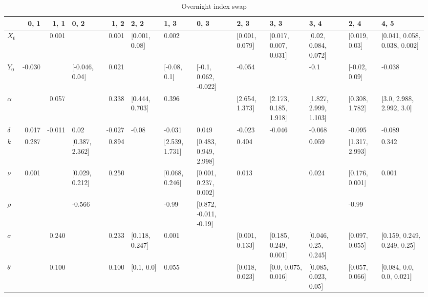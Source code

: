 \begin{table}[H]
	\centering
	\caption{Overnight index swap}
	\label{ois_table}
	
	\begin{adjustbox}{width=\textwidth}

\begin{tabular}{lrrlrllllllll}
	\toprule
	{} &   0, 1 &   1, 1 &            0, 2 &   1, 2 &            2, 2 &            1, 3 &                    0, 3 &            2, 3 &                   3, 3 &                   3, 4 &            2, 4 &                          4, 5 \\
	\midrule
	$X_0$   &        &  0.001 &                 &  0.001 &   [0.001, 0.08] &           0.002 &                         &  [0.001, 0.079] &  [0.017, 0.007, 0.031] &   [0.02, 0.084, 0.072] &   [0.019, 0.03] &  [0.041, 0.058, 0.038, 0.002] \\
	$Y_0$   & -0.030 &        &  [-0.046, 0.04] &  0.021 &                 &    [-0.08, 0.1] &   [-0.1, 0.062, -0.022] &          -0.054 &                        &                   -0.1 &   [-0.02, 0.09] &                        -0.038 \\
	$\alpha$ &        &  0.057 &                 &  0.338 &  [0.444, 0.703] &           0.396 &                         &  [2.654, 1.373] &  [2.173, 0.185, 1.918] &  [1.827, 2.999, 1.103] &  [0.308, 1.782] &      [3.0, 2.988, 2.992, 3.0] \\
	$\delta$ &  0.017 & -0.011 &            0.02 & -0.027 &           -0.08 &          -0.031 &                   0.049 &          -0.023 &                 -0.046 &                 -0.068 &          -0.095 &                        -0.089 \\
	$k$     &  0.287 &        &  [0.387, 2.362] &  0.894 &                 &  [2.539, 1.731] &   [0.483, 0.949, 2.998] &           0.404 &                        &                  0.059 &  [1.317, 2.993] &                         0.342 \\
	$\nu$    &  0.001 &        &  [0.029, 0.212] &  0.250 &                 &  [0.068, 0.246] &   [0.001, 0.237, 0.002] &           0.013 &                        &                  0.024 &  [0.176, 0.001] &                         0.001 \\
	$\rho$   &        &        &          -0.566 &        &                 &           -0.99 &  [0.872, -0.011, -0.19] &                 &                        &                        &           -0.99 &                               \\
	$\sigma$ &        &  0.240 &                 &  0.233 &  [0.118, 0.247] &           0.001 &                         &  [0.001, 0.133] &  [0.185, 0.249, 0.001] &   [0.046, 0.25, 0.245] &  [0.097, 0.055] &   [0.159, 0.249, 0.249, 0.25] \\
	$\theta$ &        &  0.100 &                 &  0.100 &      [0.1, 0.0] &           0.055 &                         &  [0.018, 0.023] &    [0.0, 0.075, 0.016] &   [0.085, 0.023, 0.05] &  [0.057, 0.066] &      [0.084, 0.0, 0.0, 0.021] \\
	\bottomrule
\end{tabular}


\end{adjustbox}
\end{table}
